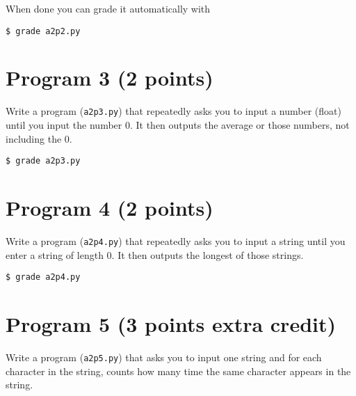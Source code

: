 \documentclass[12pt]{article}
\begin{document}
\noindent When done you can grade it automatically with
\begin{verbatim}
$ grade a2p2.py
\end{verbatim}

\section{Program 3 (2 points)}

\noindent Write a program ({\tt a2p3.py})
that repeatedly asks you to input a number (float)                                                                        
until you input the number 0. It then outputs the average or those numbers,                                                               
not including the 0.
\begin{verbatim}
$ grade a2p3.py
\end{verbatim}

\section{Program 4 (2 points)}
\noindent Write a program ({\tt a2p4.py})
that repeatedly asks you to input a string until                                                                          
you enter a string of length 0.                                                                                                           
It then outputs the longest of those strings. 
\begin{verbatim}
$ grade a2p4.py  
\end{verbatim}

\section{Program 5 (3 points extra credit)}
\noindent Write a program ({\tt a2p5.py})
that asks you to input one string and for each character in the string, counts how many time the same character appears in the string.
\end{document}
